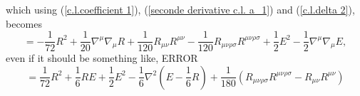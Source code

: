 which using (\ref{c.l.coefficient 1}), (\ref{seconde derivative c.l. a_1}) and (\ref{c.l.delta 2}), becomes
\begin{equation}
    [a_2] = -\frac{1}{72} R^2 + \frac{1}{20} \nabla^\mu \nabla_\mu R + \frac{1}{120} R_{\mu\nu}R^{\mu\nu} - \frac{1}{120}R_{\mu\nu\rho\sigma}R^{\mu\nu\rho\sigma} + \frac{1}{2}E^2 - \frac{1}{2}\nabla^\mu\nabla_\mu E,
\end{equation}
even if it should be something like, ERROR
\begin{equation}
    [a_2] = \frac{1}{72}R^2 + \frac{1}{6}RE + \frac{1}{2} E^2 - \frac{1}{6}\nabla^2
\left(E-\frac{1}{6}R\right)+ \frac{1}{180}(R_{\mu\nu\rho\sigma}R^{\mu\nu\rho\sigma}-R_{\mu\nu} R^{\mu\nu})\end{equation}